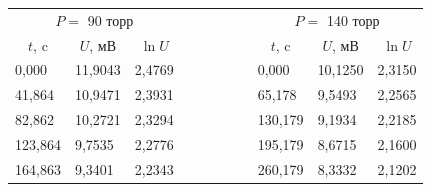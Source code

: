 \documentclass[a4paper,12pt]{article} %
\begin{document}
\begin{enumerate}
\begin{table}[h!]
	\centering
	\begin{tabular}{lllccccclll}
		\cline{1-3} \cline{9-11}
		\multicolumn{3}{|c|}{$P = $ 90 торр}                                                         &                      &                      &                      &                      & \multicolumn{1}{c|}{} & \multicolumn{3}{c|}{$P = $ 140 торр}                                                        \\ \cline{1-3} \cline{9-11} 
		\multicolumn{1}{|c|}{$t$, c}  & \multicolumn{1}{c|}{$U$, мВ} & \multicolumn{1}{c|}{$\ln{U}$} &                      &                      &                      &                      & \multicolumn{1}{c|}{} & \multicolumn{1}{c|}{$t$, c}  & \multicolumn{1}{c|}{$U$, мВ} & \multicolumn{1}{c|}{$\ln{U}$} \\ \cline{1-3} \cline{9-11} 
		\multicolumn{1}{|l|}{0,000}   & \multicolumn{1}{l|}{11,9043} & \multicolumn{1}{l|}{2,4769}   &                      &                      &                      &                      & \multicolumn{1}{c|}{} & \multicolumn{1}{l|}{0,000}   & \multicolumn{1}{l|}{10,1250} & \multicolumn{1}{l|}{2,3150}   \\ \cline{1-3} \cline{9-11} 
		\multicolumn{1}{|l|}{41,864}  & \multicolumn{1}{l|}{10,9471} & \multicolumn{1}{l|}{2,3931}   &                      &                      &                      &                      & \multicolumn{1}{c|}{} & \multicolumn{1}{l|}{65,178}  & \multicolumn{1}{l|}{9,5493}  & \multicolumn{1}{l|}{2,2565}   \\ \cline{1-3} \cline{9-11} 
		\multicolumn{1}{|l|}{82,862}  & \multicolumn{1}{l|}{10,2721} & \multicolumn{1}{l|}{2,3294}   &                      &                      &                      &                      & \multicolumn{1}{c|}{} & \multicolumn{1}{l|}{130,179} & \multicolumn{1}{l|}{9,1934}  & \multicolumn{1}{l|}{2,2185}   \\ \cline{1-3} \cline{9-11} 
		\multicolumn{1}{|l|}{123,864} & \multicolumn{1}{l|}{9,7535}  & \multicolumn{1}{l|}{2,2776}   &                      &                      &                      &                      & \multicolumn{1}{c|}{} & \multicolumn{1}{l|}{195,179} & \multicolumn{1}{l|}{8,6715}  & \multicolumn{1}{l|}{2,1600}   \\ \cline{1-3} \cline{9-11} 
		\multicolumn{1}{|l|}{164,863} & \multicolumn{1}{l|}{9,3401}  & \multicolumn{1}{l|}{2,2343}   &                      &                      &                      &                      & \multicolumn{1}{c|}{} & \multicolumn{1}{l|}{260,179} & \multicolumn{1}{l|}{8,3332}  & \multicolumn{1}{l|}{2,1202}   \\ \cline{1-3} \cline{9-11} 

\end{tabular}
\end{table}
\end{enumerate}
\end{document}

